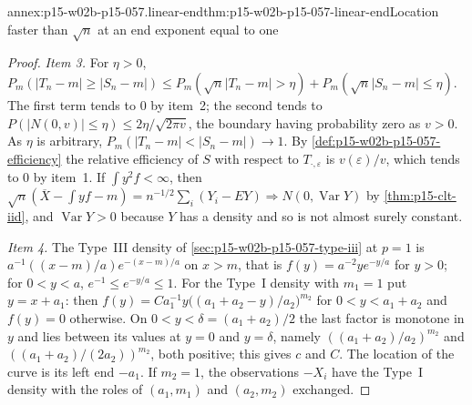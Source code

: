 \begin{annexitem}{annex:p15-w02b-p15-057.linear-end}{thm:p15-w02b-p15-057-linear-end}{Location faster than \(\sqrt n\) at an end exponent equal to one}
\begin{proof}
\emph{Item 3.} For \(\eta>0\),
\(P_m(|T_n-m|\geq|S_n-m|)\leq P_m(\sqrt n|T_n-m|>\eta)
+P_m(\sqrt n|S_n-m|\leq\eta)\). The first term tends to \(0\) by item~2;
the second tends to \(P(|N(0,v)|\leq\eta)\leq2\eta/\sqrt{2\pi v}\), the
boundary having probability zero as \(v>0\). As \(\eta\) is arbitrary,
\(P_m(|T_n-m|<|S_n-m|)\to1\). By
\cref{def:p15-w02b-p15-057-efficiency} the relative efficiency of \(S\) with
respect to \(T_{\cdot,\varepsilon}\) is \(v(\varepsilon)/v\), which tends to
\(0\) by item~1. If \(\int y^2f<\infty\), then
\(\sqrt n(\overline X-\int yf-m)=n^{-1/2}\sum_i(Y_i-EY)\Rightarrow
N(0,\operatorname{Var}Y)\) by \cref{thm:p15-clt-iid}, and
\(\operatorname{Var}Y>0\) because \(Y\) has a density and so is not almost
surely constant.

\emph{Item 4.} The Type~III density of
\cref{sec:p15-w02b-p15-057-type-iii} at \(p=1\) is
\(a^{-1}((x-m)/a)e^{-(x-m)/a}\) on \(x>m\), that is \(f(y)=a^{-2}ye^{-y/a}\)
for \(y>0\); for \(0<y<a\), \(e^{-1}\leq e^{-y/a}\leq1\). For the Type~I
density with \(m_1=1\) put \(y=x+a_1\): then
\(f(y)=Ca_1^{-1}y\bigl((a_1+a_2-y)/a_2\bigr)^{m_2}\) for \(0<y<a_1+a_2\) and
\(f(y)=0\) otherwise. On \(0<y<\delta=(a_1+a_2)/2\) the last factor is
monotone in \(y\) and lies between its values at \(y=0\) and
\(y=\delta\), namely \(((a_1+a_2)/a_2)^{m_2}\) and
\(((a_1+a_2)/(2a_2))^{m_2}\), both positive; this gives \(c\) and \(C\). The
location of the curve is its left end \(-a_1\). If \(m_2=1\), the
observations \(-X_i\) have the Type~I density with the roles of
\((a_1,m_1)\) and \((a_2,m_2)\) exchanged.
\end{proof}
\end{annexitem}

